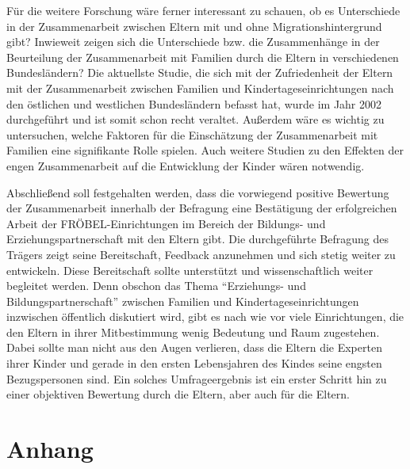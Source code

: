 \documentclass[12pt,a4paper]{article}
\begin{document}
	Für die weitere Forschung wäre ferner interessant zu schauen, ob es Unterschiede in  der Zusammenarbeit zwischen Eltern mit und ohne Migrationshintergrund gibt? Inwieweit zeigen sich die Unterschiede bzw. die Zusammenhänge in der Beurteilung der Zusammenarbeit mit Familien durch die Eltern in verschiedenen Bundesländern?  Die aktuellste Studie, die sich mit der Zufriedenheit der Eltern mit der Zusammenarbeit zwischen Familien und Kindertageseinrichtungen nach den östlichen und westlichen Bundesländern befasst hat, wurde im Jahr 2002 durchgeführt und ist somit schon recht veraltet. Außerdem wäre es wichtig zu untersuchen, welche Faktoren für die Einschätzung der Zusammenarbeit mit Familien eine signifikante Rolle spielen. Auch weitere Studien zu den Effekten der engen Zusammenarbeit auf die Entwicklung der Kinder wären notwendig.
	
	Abschließend soll festgehalten werden, dass die vorwiegend positive Bewertung der Zusammenarbeit innerhalb der Befragung eine Bestätigung der erfolgreichen Arbeit der FRÖBEL-Einrichtungen im Bereich der Bildungs- und Erziehungspartnerschaft mit den Eltern gibt. Die durchgeführte Befragung des Trägers zeigt seine Bereitschaft, Feedback anzunehmen und sich stetig weiter zu entwickeln. Diese Bereitschaft sollte unterstützt und wissenschaftlich weiter begleitet werden. Denn obschon das Thema "`Erziehungs- und Bildungspartnerschaft"' zwischen Familien und Kindertageseinrichtungen inzwischen öffentlich diskutiert wird, gibt es nach wie vor viele Einrichtungen, die den Eltern in ihrer Mitbestimmung wenig Bedeutung und Raum zugestehen. Dabei sollte man nicht aus den Augen verlieren, dass die Eltern die Experten ihrer Kinder und gerade in den ersten Lebensjahren des Kindes seine engsten Bezugspersonen sind. Ein solches Umfrageergebnis ist ein erster Schritt hin zu einer objektiven Bewertung durch die Eltern, aber auch für die Eltern.



      



%




\pagebreak

\begin{appendix}
\section*{Anhang}
\normalsize
\section{}
\end{appendix}
  
\end{document}
